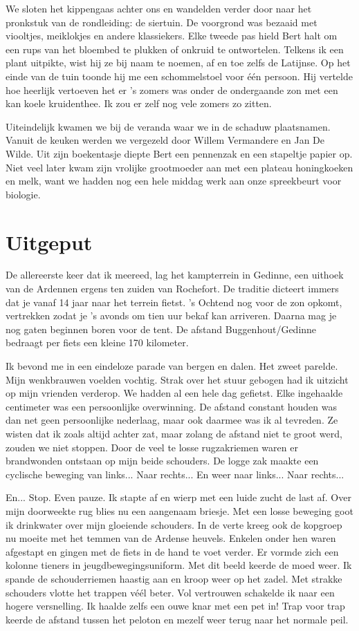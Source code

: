 \documentclass[12pt, justified, a4paper, symmetric]{tufte-book}
\begin{document}
We sloten het kippengaas achter ons en wandelden verder door naar het pronkstuk van de rondleiding: de siertuin. De voorgrond was bezaaid met viooltjes, meiklokjes en andere klassiekers. Elke tweede pas hield Bert halt om een rups van het bloembed te plukken of onkruid te ontwortelen. Telkens ik een plant uitpikte, wist hij ze bij naam te noemen, af en toe zelfs de Latijnse. Op het einde van de tuin toonde hij me een schommelstoel voor \'e\'en persoon. Hij vertelde hoe heerlijk vertoeven het er 's zomers was onder de ondergaande zon met een kan koele kruidenthee. Ik zou er zelf nog vele zomers zo zitten.

Uiteindelijk kwamen we bij de veranda waar we in de schaduw plaatsnamen. Vanuit de keuken werden we vergezeld door Willem Vermandere en Jan De Wilde. Uit zijn boekentasje diepte Bert een pennenzak en een stapeltje papier op. Niet veel later kwam zijn vrolijke grootmoeder aan met een plateau honingkoeken en melk, want we hadden nog een hele middag werk aan onze spreekbeurt voor biologie.

\section{Uitgeput}
De allereerste keer dat ik meereed, lag het kampterrein in Gedinne, een uithoek van de Ardennen ergens ten zuiden van Rochefort. De traditie dicteert immers dat je vanaf 14 jaar naar het terrein fietst. 's Ochtend nog voor de zon opkomt, vertrekken zodat je 's avonds om tien uur bekaf kan arriveren. Daarna mag je nog gaten beginnen boren voor de tent. De afstand Buggenhout/Gedinne bedraagt per fiets een kleine 170 kilometer.

Ik bevond me in een eindeloze parade van bergen en dalen. Het zweet parelde. Mijn wenkbrauwen voelden vochtig. Strak over het stuur gebogen had ik uitzicht op mijn vrienden verderop. We hadden al een hele dag gefietst.  Elke ingehaalde centimeter was een persoonlijke overwinning. De afstand constant houden was dan net geen persoonlijke nederlaag, maar ook daarmee was ik al tevreden. Ze wisten dat ik zoals altijd achter zat, maar zolang de afstand niet te groot werd, zouden we niet stoppen. Door de veel te losse rugzakriemen waren er brandwonden ontstaan op mijn beide schouders. De logge zak maakte een cyclische beweging van links... Naar rechts... En weer naar links... Naar rechts...

En... Stop. Even pauze. Ik stapte af en wierp met een luide zucht de last af. Over mijn doorweekte rug blies nu een aangenaam briesje. Met een losse beweging goot ik drinkwater over mijn gloeiende schouders. In de verte kreeg ook de kopgroep nu moeite met het temmen van de Ardense heuvels. Enkelen onder hen waren afgestapt en gingen met de fiets in de hand te voet verder. Er vormde zich een kolonne tieners in jeugdbewegingsuniform. Met dit beeld keerde de moed weer. Ik spande de schouderriemen haastig aan en kroop weer op het zadel. Met strakke schouders vlotte het trappen v\'e\'el beter. Vol vertrouwen schakelde ik naar een hogere versnelling. Ik haalde zelfs een ouwe knar met een pet in! Trap voor trap keerde de afstand tussen het peloton en mezelf weer terug naar het normale peil.
\end{document}
